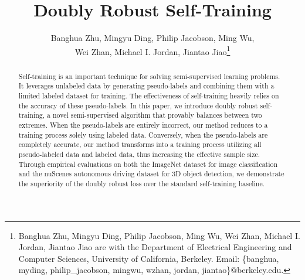 \documentclass{article}
\title{Doubly Robust  Self-Training}
\author{Banghua Zhu, Mingyu Ding, Philip Jacobson, Ming Wu, \\ 
Wei Zhan, Michael I. Jordan, Jiantao Jiao\thanks{Banghua Zhu, Mingyu Ding, Philip Jacobson, Ming Wu,
Wei Zhan, Michael I. Jordan, Jiantao Jiao are with the Department of Electrical Engineering and Computer Sciences, University of California, Berkeley. Email: \{banghua, myding, philip\_jacobson, mingwu, wzhan, jordan, jiantao\}@berkeley.edu.}}
\theoremstyle{definition}
\begin{document}
\maketitle


\begin{abstract}
Self-training is an important technique for solving semi-supervised learning problems.  It leverages unlabeled data by generating pseudo-labels and combining them with a limited labeled dataset for training. The effectiveness of self-training heavily relies on the accuracy of these pseudo-labels. In this paper, we introduce doubly robust self-training, a novel semi-supervised algorithm that provably balances between two extremes. When the pseudo-labels are entirely incorrect, our method reduces to a training process solely using labeled data. Conversely, when the pseudo-labels are completely accurate, our method transforms into a training process utilizing all pseudo-labeled data and labeled data, thus increasing the effective sample size. Through empirical evaluations on both the ImageNet dataset for image classification and the nuScenes autonomous driving dataset for 3D object detection, we demonstrate the superiority of the doubly robust loss over the standard self-training baseline.
\end{abstract}



\newpage

\newpage 
\appendix

\end{document}
